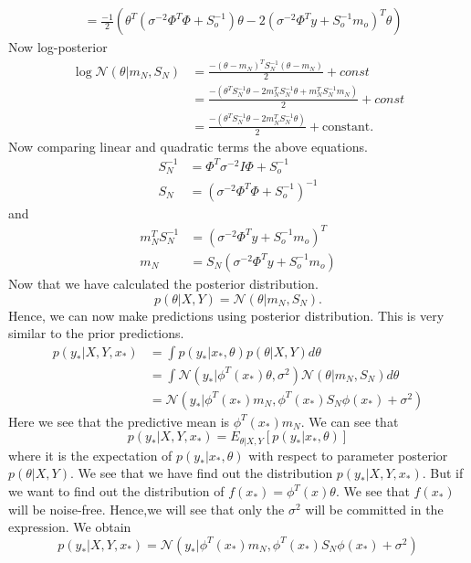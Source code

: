 \documentclass[12pt]{article}
\numberwithin{equation}{section}
\begin{document}
{\begin{align*}
 	&= \frac{-1}{2}(\theta^T(\sigma^{-2}\Phi^T\Phi + S_o^{-1})\theta - 2(\sigma^{-2}\Phi^Ty + S_o^{-1}m_o)^T\theta)
 \end{align*}
Now log-posterior 
\begin{align*}
	\log \mathcal{N}(\theta|m_N, S_N) &= \frac{-(\theta - m_N)^TS_N^{-1}(\theta - m_N)}{2} + const\\
	&= \frac{-(\theta^TS_N^{-1}\theta - 2m_N^TS_N^{-1}\theta + m_N^TS_N^{-1}m_N)}{2} + const\\
	&= \frac{-(\theta^TS_N^{-1}\theta -  2m_N^TS_N^{-1}\theta)}{2} + \text{constant}.
\end{align*}
Now comparing linear and quadratic terms the above equations.
\begin{align*}
	S_N^{-1} &= \Phi^T\sigma^{-2}I\Phi + S_o^{-1}\\
	S_N &= (\sigma^{-2}\Phi^T\Phi + S_o^{-1})^{-1}
\end{align*}
and
\begin{align*}
	m_N^TS_N^{-1} &= (\sigma^{-2}\Phi^Ty + S_o^{-1}m_o)^T\\
	m_N &= S_N(\sigma^{-2}\Phi^Ty + S_o^{-1}m_o)
\end{align*}
Now that we have calculated the posterior distribution.
$$p(\theta|X, Y) = \mathcal{N}(\theta|m_N, S_N).$$
Hence, we can now make predictions using posterior distribution. This is very similar to the prior predictions.
\begin{align*}
	p(y_*| X, Y, x_*) &= \int p(y_*|x_*, \theta)p(\theta|X, Y)d\theta\\
	&= \int \mathcal{N}(y_*|\phi^T(x_*)\theta, \sigma^2)\mathcal{N}(\theta|m_N, S_N)d\theta\\
	&= \mathcal{N}(y_*| \phi^T(x_*)m_N, \phi^T(x_*)S_N\phi(x_*) + \sigma^2)
\end{align*}
Here we see that the predictive mean is $\phi^T(x_*)m_N$. We can see that
\begin{equation*}
	p(y_*|X, Y, x_*) = E_{\theta|X,Y}[p(y_*|x_*, \theta)]
\end{equation*}
where it is the expectation of $p(y_*|x_*, \theta)$ with respect to parameter posterior $p(\theta|X, Y)$. We see that we have find out the distribution $p(y_*|X, Y, x_*)$. But if we want to find out the distribution of $f(x_*) = \phi^T(x)\theta$. We see that $f(x_*)$ will be noise-free. Hence,we will see that only the $\sigma^2$ will be committed in the expression. We obtain
\begin{equation*}
	p(y_*| X, Y, x_*) = \mathcal{N}(y_*| \phi^T(x_*)m_N, \phi^T(x_*)S_N\phi(x_*) + \sigma^2)

\end{equation*}}
\end{document}
